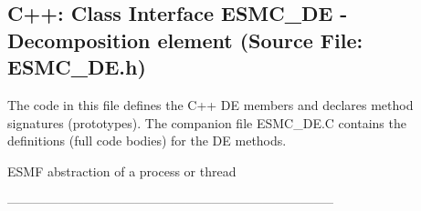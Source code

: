  
\parskip        0pt
\parindent      0pt
\baselineskip  11pt
 
\def\bv{\begin{verbatim}}
\def\ev{\end{verbatim}}
\def\be{\begin{equation}}
\def\ee{\end{equation}}
\def\bea{\begin{eqnarray}}
\def\eea{\end{eqnarray}}
\def\bi{\begin{itemize}}
\def\ei{\end{itemize}}
\def\bn{\begin{enumerate}}
\def\en{\end{enumerate}}
\def\bd{\begin{description}}
\def\ed{\end{description}}
\def\({\left (}
\def\){\right )}
\def\[{\left [}
\def\]{\right ]}
\def\<{\left  \langle}
\def\>{\right \rangle}
\def\cI{{\cal I}}
\def\diag{\mathop{\rm diag}}
\def\tr{\mathop{\rm tr}}


 
\subsection{C++:  Class Interface ESMC\_DE - Decomposition element (Source File: ESMC\_DE.h)}


  
  
   The code in this file defines the C++ DE members and declares method 
   signatures (prototypes).  The companion file ESMC\_DE.C contains
   the definitions (full code bodies) for the DE methods.
  
   ESMF abstraction of a process or thread
  
  -----------------------------------------------------------------------------
   
